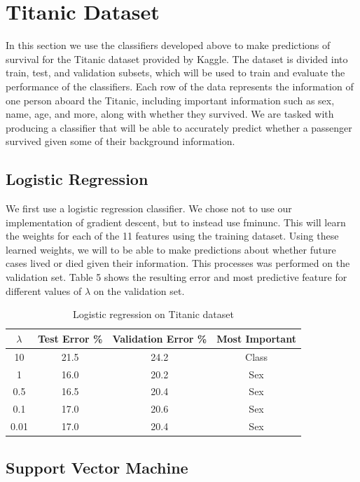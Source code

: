 \documentclass[12pt, twocolumn]{article}
\begin{document}
\section{Titanic Dataset}

In this section we use the classifiers developed above to make predictions of survival for the Titanic dataset provided by Kaggle. The dataset is divided into train, test, and validation subsets, which will be used to train and evaluate the performance of the classifiers. Each row of the data represents the information of one person aboard the Titanic, including important information such as sex, name, age, and more, along with whether they survived. We are tasked with producing a classifier that will be able to accurately predict whether a passenger survived given some of their background information.

\subsection*{Logistic Regression}

We first use a logistic regression classifier. We chose not to use our implementation of gradient descent, but to instead use fminunc. This will learn the weights for each of the 11 features using the training dataset. Using these learned weights, we will to be able to make predictions about whether future cases lived or died given their information. This processes was performed on the validation set. Table 5 shows the resulting error and most predictive feature for different values of $\lambda$ on the validation set.

\begin{table}
\tiny
 \caption{Logistic regression on Titanic dataset}
  \begin{tabular}{ | c | c | c | c |}
 \hline
 $\lambda$ & Test Error \% & Validation Error \% & Most Important  \\ \hline 
 10 & 21.5 & 24.2 & Class  \\ \hline
 1 & 16.0 & 20.2 & Sex  \\ \hline
 0.5 & 16.5 & 20.4 & Sex \\ \hline
 0.1 & 17.0 & 20.6 & Sex \\ \hline 
 0.01 & 17.0 & 20.4 & Sex \\ \hline
 \end{tabular}
 \label{SVM C1 T}
\end{table}
      
\subsection*{Support Vector Machine}
\end{document}
